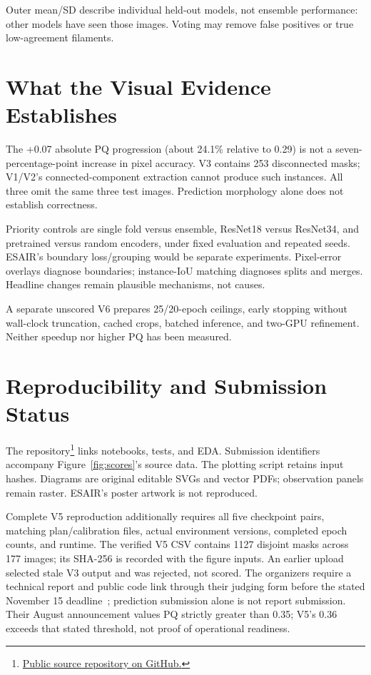 \documentclass[sigconf]{acmart}
\begin{document}
Outer mean/SD describe individual held-out models, not ensemble performance:
other models have seen those images. Voting may remove false positives
or true low-agreement filaments.

\section{What the Visual Evidence Establishes}
The +0.07 absolute PQ progression (about 24.1\% relative to 0.29)
is not a seven-percentage-point increase in pixel accuracy.
V3 contains 253 disconnected masks; V1/V2's connected-component extraction
cannot produce such instances. All three omit the same three test images.
Prediction morphology alone does not establish correctness.

Priority controls are single fold versus ensemble, ResNet18 versus ResNet34,
and pretrained versus random encoders, under fixed evaluation and repeated
seeds. ESAIR's boundary loss/grouping would be separate experiments.
Pixel-error overlays diagnose boundaries; instance-IoU matching diagnoses
splits and merges. Headline changes remain plausible mechanisms, not causes.

A separate unscored V6 prepares 25/20-epoch ceilings, early stopping
without wall-clock truncation, cached crops, batched inference, and two-GPU refinement.
Neither speedup nor higher PQ has been measured.

\section{Reproducibility and Submission Status}
The repository\footnote{\href{https://github.com/Greg-Kojadinovich/solar-filament-segmentation-2026}{Public source repository on GitHub.}}
links notebooks, tests, and EDA. Submission identifiers accompany
Figure~\ref{fig:scores}'s source data. The plotting script retains input
hashes. Diagrams are original editable SVGs and vector PDFs; observation
panels remain raster. ESAIR's poster artwork is not reproduced.

Complete V5 reproduction additionally requires all five checkpoint pairs,
matching plan/calibration files, actual environment versions, completed
epoch counts, and runtime. The verified V5 CSV contains 1127 disjoint masks
across 177 images; its SHA-256 is recorded with the figure inputs.
An earlier upload selected stale V3 output and was rejected, not scored.
The organizers require a technical report and public code link through their
judging form before the stated November 15 deadline~\cite{filamentannouncements};
prediction submission alone is not report submission.
Their August announcement values PQ strictly greater than 0.35;
V5's 0.36 exceeds that stated threshold, not proof of operational readiness.
\end{document}
